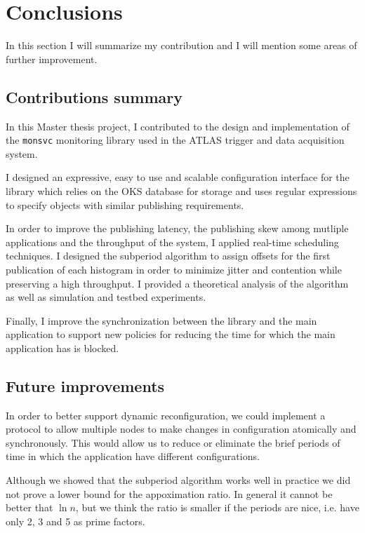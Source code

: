 \chapter{Conclusions} %
\label{Capitolul6}


In this section I will summarize my contribution and I will mention some areas of further improvement.

\section{Contributions summary}

In this Master thesis project, I contributed to the design and implementation of the {\tt monsvc} monitoring library used in the ATLAS trigger and data acquisition system.

I designed an expressive, easy to use and scalable configuration interface for the library which relies on the OKS \citep{jones1998oks} database for storage and uses regular expressions to specify objects with similar publishing requirements.

In order to improve the publishing latency, the publishing skew among mutliple applications and the throughput of the system, I applied real-time scheduling techniques. I designed the subperiod algorithm to assign offsets for the first publication of each histogram in order to minimize jitter and contention while preserving a high throughput. I provided a theoretical analysis of the algorithm as well as simulation and testbed experiments.

Finally, I improve the synchronization between the library and the main application to support new policies for reducing the time for which the main application has is blocked.


\section{Future improvements}

In order to better support dynamic reconfiguration, we could implement a protocol to allow multiple nodes to make changes in configuration atomically and synchronously. This would allow us to reduce or eliminate the brief periods of time in which the application have different configurations.

Although we showed that the subperiod algorithm works well in practice we did not prove a lower bound for the appoximation ratio. In general it cannot be better that $\ln n$, but we think the ratio is smaller if the periods are nice, i.e. have only 2, 3 and 5 as prime factors.